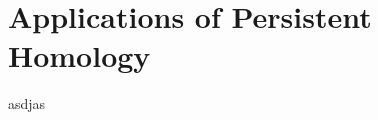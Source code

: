 \chapter{Applications of Persistent Homology}
\graphicspath{ {/home/tomasp/Dokumenty/Master_Thesis/figures/} }

asdjas
